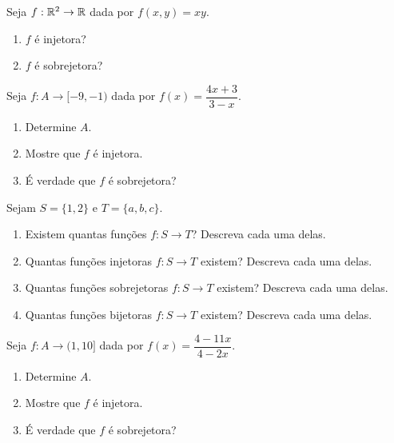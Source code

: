 \documentclass[12pt]{exam}
\begin{document}
    \newpage

    \questao{} Seja $f: \mathbb{R}^2 \to \mathbb{R}$ dada por $f(x,y) = xy$.
    \begin{enumerate}[label={\alph*})]
        \item $f$ {\'e} injetora?

        \item $f$ {\'e} sobrejetora?
    \end{enumerate}

    \vspace{.3cm}

    \questao{} Seja $f : A \to [-9,-1)$ dada por $f(x) = \dfrac{4x + 3}{3 - x}$.
    \begin{enumerate}[label={\alph*})]
        \item Determine $A$.

        \item Mostre que $f$ \'e injetora.

        \item \'E verdade que $f$ \'e sobrejetora?
    \end{enumerate}

    \vspace{.3cm}

    \questao{} Sejam $S = \{1,2\}$ e $T = \{a, b, c\}$.
    \begin{enumerate}[label={\alph*})]
        \item Existem quantas funções $f : S \to T$? Descreva cada uma delas.

        \item Quantas funções injetoras $f : S \to T$ existem? Descreva cada uma delas.

        \item Quantas funções sobrejetoras $f : S \to T$ existem? Descreva cada uma delas.

        \item Quantas funções bijetoras $f : S \to T$ existem? Descreva cada uma delas.
    \end{enumerate}

    \vspace{.3cm}

    \questao{} Seja $f : A \to (1,10]$ dada por $f(x) = \dfrac{4 - 11x}{4 - 2x}$.
    \begin{enumerate}[label={\alph*})]
        \item Determine $A$.

        \item Mostre que $f$ \'e injetora.

        \item \'E verdade que $f$ \'e sobrejetora?
    \end{enumerate}
\end{document}
